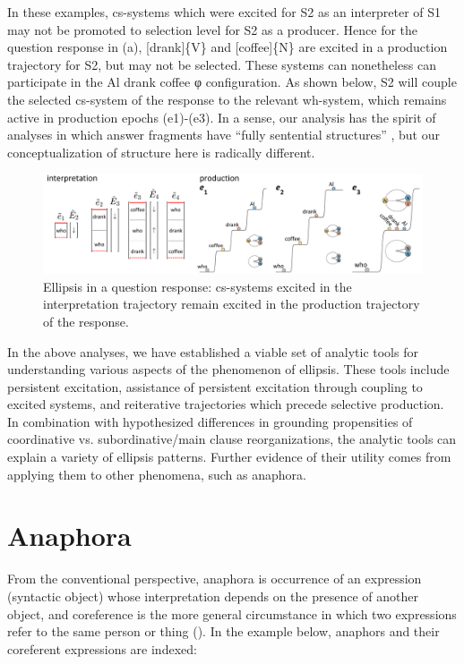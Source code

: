   In these examples, cs-systems which were excited for S2 as an interpreter of S1 may not be promoted to selection level for S2 as a producer. Hence for the question response in (a), [drank]\{V\} and [coffee]\{N\} are excited in a production trajectory for S2, but may not be selected. These systems can nonetheless can participate in the {\textbar}Al drank coffee{\textbar} φ configuration. As shown below, S2 will couple the selected cs-system of the response to the relevant wh-system, which remains active in production epochs (e1)-(e3). In a sense, our analysis has the spirit of analyses in which answer fragments have “fully sentential structures”  \citep{Merchant2005}, but our conceptualization of structure here is radically different.

  
\begin{figure}
\includegraphics[width=\textwidth]{figures/Tilsen-img151.png}
\caption{Ellipsis in a question response: cs-systems excited in the interpretation trajectory remain excited in the production trajectory of the response.}
\label{fig:7:7}
\end{figure}
 

  In the above analyses, we have established a viable set of analytic tools for understanding various aspects of the phenomenon of ellipsis. These tools include persistent excitation, assistance of persistent excitation through coupling to excited systems, and reiterative trajectories which precede selective production. In combination with hypothesized differences in grounding propensities of coordinative vs. subordinative/main clause reorganizations, the analytic tools can explain a variety of ellipsis patterns. Further evidence of their utility comes from applying them to other phenomena, such as anaphora.

\section{Anaphora}

From the conventional perspective, anaphora is occurrence of an expression (syntactic object) whose interpretation depends on the presence of another object, and coreference is the more general circumstance in which two expressions refer to the same person or thing (\citealt{HankamerSag1976,Huang2000,Reinhart1983,Reinhart2016,Safir2004}). In the example below, anaphors and their coreferent expressions are indexed:

